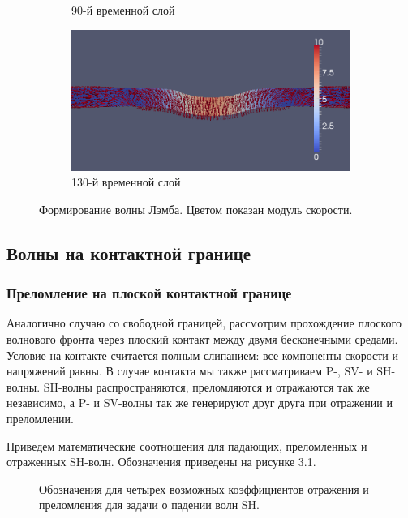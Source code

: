 \begin{figure}[htp]
\begin{subfigure}[b]{0.5\textwidth}
\caption{90-й временной слой}
\end{subfigure}
\begin{subfigure}[b]{0.5\textwidth}
\centering
\includegraphics[width=\textwidth]{png/lamb-wave/130.png}
\caption{130-й временной слой}
\end{subfigure}
\caption{Формирование волны Лэмба. Цветом показан модуль скорости.}
\label{pic:lamb_wave}
\end{figure}


\clearpage
\newpage


\subsection{Волны на контактной границе}

\subsubsection{Преломление на плоской контактной границе}

Аналогично случаю со свободной границей, рассмотрим прохождение плоского волнового фронта через плоский контакт между двумя бесконечными средами. Условие на контакте считается полным слипанием: все компоненты скорости и напряжений равны. В случае контакта мы также рассматриваем P-, SV- и SH-волны. SH-волны распространяются, преломляются и отражаются так же независимо, а P- и SV-волны так же генерируют друг друга при отражении и преломлении. 

Приведем математические соотношения для падающих, преломленных и отраженных SH-волн. Обозначения приведены на рисунке 3.1.

\begin{figure}[h]
\caption{Обозначения для четырех возможных коэффициентов отражения и преломления для задачи о падении волн SH.}
\end{figure}

